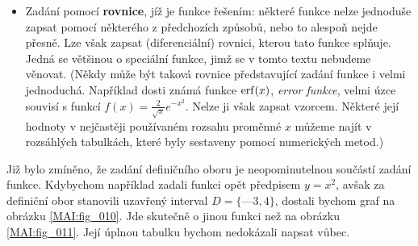 {\begin{itemize}
          \begin{figure}[ht!]
            \centering  
            \begin{tabular}{cc}
              \subfloat[ ]{\label{MAI:fig_011}
                }              &
              \subfloat[ ]{\label{MAI:fig_010}
                }              \\
            \end{tabular}
            \caption{Zadání funkce grafem}
          \end{figure}
          Z grafu můžeme ovšem funkční hodnoty určit pouze přibližně. Pro další matematické 
          zpracování je grafické zadání nejméně vhodné, i když jeho praktický význam například v 
          technických aplikacích nelze popřít.
        \item Zadání pomocí \textbf{rovnice}, jíž je funkce řešením: některé funkce nelze jednoduše 
              zapsat pomocí některého z předchozích způsobů, nebo to alespoň nejde přesně. Lze však 
              zapsat (diferenciální) rovnici, kterou tato funkce splňuje. Jedná se většinou o 
              speciální funkce, jimž se v tomto textu nebudeme věnovat. (Někdy může být taková 
              rovnice  představující zadání funkce i velmi jednoduchá. Například dosti známá funkce 
              \(\operatorname{erf}(x)\), \emph{error funkce}, velmi úzce souvisí s funkcí \(f(x) = 
              \frac{2}{\sqrt{x}}e^{-x^2}\). Nelze ji však zapsat vzorcem. Některé její hodnoty v 
              nejčastěji používaném rozsahu proměnné \(x\) můžeme najít v rozsáhlých tabulkách, 
              které byly sestaveny pomocí numerických metod.)
      \end{itemize}
      
      Již bylo zmíněno, že zadání definičního oboru je neopominutelnou součástí zadání funkce. 
      Kdybychom například zadali funkci opět předpisem \(y=x^2\), avšak za definiční obor stanovili 
      uzavřený interval \(D = \lbrace —3,4\rbrace\), dostali bychom graf na obrázku 
      \ref{MAI:fig_010}. Jde skutečně o jinou funkci než na obrázku \ref{MAI:fig_011}. Její úplnou 
      tabulku bychom nedokázali napsat vůbec.
      

}
